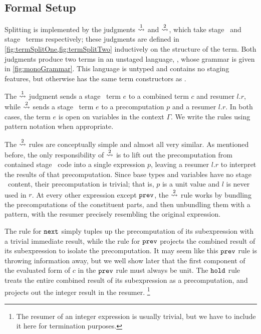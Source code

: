 \subsection {Formal Setup}

Splitting is implemented by the judgments $\overset{ 1}\rightsquigarrow$ and $\overset{ 2}\rightsquigarrow$,
which take stage \bbone\ and stage \bbtwo\ terms respectively; these judgments
are defined in \cref{fig:termSplitOne,fig:termSplitTwo} inductively on the
structure of the term. Both judgments produce two terms in an unstaged language,
\langmono, whose grammar is given in \ref{fig:monoGrammar}. This language is
untyped and contains no staging features, but otherwise has the same term
constructors as \lang.

The $\overset{ 1}\rightsquigarrow$ judgment sends a stage \bbone\ term $e$ to a combined term
$c$ and resumer $l.r$, while $\overset{ 2}\rightsquigarrow$ sends a stage \bbtwo\ term $e$ to a
precomputation $p$ and a resumer $l.r$. In both cases, the term $e$ is open on
variables in the context $\Gamma$. We write the rules using pattern notation
when appropriate.


The $\overset{ 2}\rightsquigarrow$ rules are conceptually simple and almost all very similar.  
As mentioned before, the only responsibility of $\overset{ 2}\rightsquigarrow$ is to lift out the precomputation
from contained stage \bbone\ code into a single expression $p$, 
leaving a resumer $l.r$ to interpret the results of that precomputation.
Since base types and variables have no stage \bbone\ content, their precomputation is trivial;
that is, $p$ is a unit value and $l$ is never used in $r$.
At every other expression except ${\tt prev}$, the $\overset{ 2}\rightsquigarrow$ rule works by bundling 
the precomputations of the constituent parts, and then unbundling them with a pattern,
with the resumer precisely resembling the original expression.

The rule for ${\tt next}$ simply tuples up the precomputation of its subexpression with a trivial immediate result,
while the rule for ${\tt prev}$ projects the combined result of its subexpression to isolate the precomputation.
It may seem like this ${\tt prev}$ rule is throwing information away, but we well show later that the first component 
of the evaluated form of $c$ in the ${\tt prev}$ rule must always be unit.
The ${\tt hold}$ rule treats the entire combined result of its subexpression as a precomputation, 
and projects out the integer result in the resumer.%
\footnote{The resumer of an integer expression is usually trivial, 
but we have to include it here for termination purposes.}

